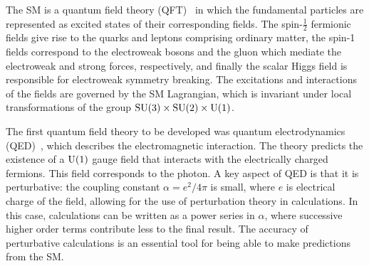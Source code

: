 The SM is a quantum field theory (QFT)~\cite{1995.Weinberg, 1995.Peskin} in which the fundamental particles are represented as excited states of their corresponding fields.
The spin-$\frac{1}{2}$ fermionic fields give rise to the quarks and leptons comprising ordinary matter, the spin-1 fields correspond to the electroweak bosons and the gluon which mediate the electroweak and strong forces, respectively, and finally the scalar Higgs field is responsible for electroweak symmetry breaking.
The excitations and interactions of the fields are governed by the SM Lagrangian, which is invariant under local transformations of the group $\textrm{SU}(3)\times\textrm{SU}(2)\times\textrm{U}(1)$.

The first quantum field theory to be developed was quantum electrodynamics (QED)~\cite{1950.Feynman.QED}, which describes the electromagnetic interaction.
The theory predicts the existence of a $\textrm{U}(1)$ gauge field that interacts with the electrically charged fermions.
This field corresponds to the photon.
A key aspect of QED is that it is perturbative: the coupling constant $\alpha = e^2/4\pi$ is small, where $e$ is electrical charge of the field, allowing for the use of perturbation theory in calculations.
In this case, calculations can be written as a power series in $\alpha$, where successive higher order terms contribute less to the final result.
The accuracy of perturbative calculations is an essential tool for being able to make predictions from the SM.

